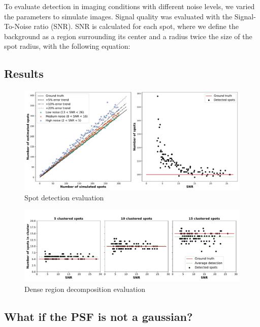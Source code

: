 To evaluate detection in imaging conditions with different noise levels,
we varied the parameters to simulate images. Signal quality was evaluated
with the Signal-To-Noise ratio (SNR). SNR is calculated for each spot, where
we define the background as a region surrounding its center and a radius
twice the size of the spot radius, with the following equation:


\subsection{Results} \label{subsec:detection_results}



\begin{figure}[h]
    \centering
    \includegraphics[width=1\textwidth]{figures/chapter2/fused_spot_detection_noise}
    \caption{Spot detection evaluation}
    \label{fig:detection_error}
\end{figure}

\begin{figure}[h]
    \centering
    \includegraphics[width=1\textwidth]{figures/chapter2/cluster_along_noise}
    \caption{Dense region decomposition evaluation}
    \label{fig:cluster_results}
\end{figure}


\subsection{What if the \ac{PSF} is not a gaussian?} \label{subsec:psf}



